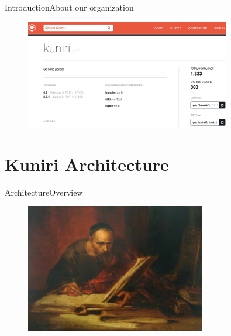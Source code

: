 \documentclass[10pt]{beamer}
\begin{document}
\begin{frame}{Introduction}{About our organization}
  \begin{figure}[overview]
    \includegraphics[width=0.8\textwidth]{images/rubygems.png}
  \end{figure}
\end{frame}

\section{Kuniri Architecture}
\begin{frame}{Architecture}{Overview}
  \begin{figure}[overview]
    \includegraphics[width=0.7\textwidth]{images/scribe_cattermole.jpg}
  \end{figure}
\end{frame}
\end{document}
